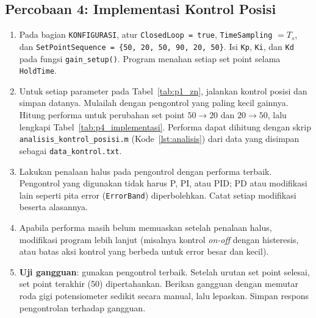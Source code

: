 \documentclass[11pt,a4paper]{article}
\newcommand{\prog}[1]{\texttt{#1}}
\begin{document}
\subsection{Percobaan 4: Implementasi Kontrol Posisi}
\begin{enumerate}
\item Pada bagian \texttt{KONFIGURASI}, atur \texttt{ClosedLoop = true}, \texttt{TimeSampling} $= T_s$, dan \texttt{SetPointSequence = \{50, 20, 50, 90, 20, 50\}}. Isi \texttt{Kp}, \texttt{Ki}, dan \texttt{Kd} pada fungsi \texttt{gain\_setup()}. Program menahan setiap set point selama \texttt{HoldTime}.
\item Untuk setiap parameter pada Tabel~\ref{tab:p1_zn}, jalankan kontrol posisi dan simpan datanya. Mulailah dengan pengontrol yang paling kecil gainnya. Hitung performa untuk perubahan set point $50 \rightarrow 20$ dan $20 \rightarrow 50$, lalu lengkapi Tabel~\ref{tab:p4_implementasi}. Performa dapat dihitung dengan skrip \prog{analisis\_kontrol\_posisi.m} (Kode~\ref{lst:analisis}) dari data yang disimpan sebagai \prog{data\_kontrol.txt}.
\item Lakukan penalaan halus pada pengontrol dengan performa terbaik. Pengontrol yang digunakan tidak harus P, PI, atau PID; PD atau modifikasi lain seperti pita error (\texttt{ErrorBand}) diperbolehkan. Catat setiap modifikasi beserta alasannya.
\item Apabila performa masih belum memuaskan setelah penalaan halus, modifikasi program lebih lanjut (misalnya kontrol \textit{on-off} dengan histeresis, atau batas aksi kontrol yang berbeda untuk error besar dan kecil).
\item \textbf{Uji gangguan}: gunakan pengontrol terbaik. Setelah urutan set point selesai, set point terakhir (50) dipertahankan. Berikan gangguan dengan memutar roda gigi potensiometer sedikit secara manual, lalu lepaskan. Simpan respons pengontrolan terhadap gangguan.
\end{enumerate}
\end{document}
